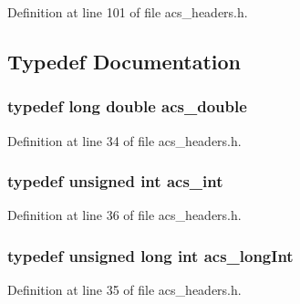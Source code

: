 Definition at line 101 of file acs\-\_\-headers.\-h.



\subsection{Typedef Documentation}
\hypertarget{a00072_ab776853a005fcbf56af0424a2a4dd607}{
\subsubsection[{acs\-\_\-double}]{\setlength{\rightskip}{0pt plus 5cm}typedef long double {\bf acs\-\_\-double}}}\label{a00072_ab776853a005fcbf56af0424a2a4dd607}


Definition at line 34 of file acs\-\_\-headers.\-h.

\hypertarget{a00072_a8d277355641a098190360234e2ebde35}{
\subsubsection[{acs\-\_\-int}]{\setlength{\rightskip}{0pt plus 5cm}typedef unsigned int {\bf acs\-\_\-int}}}\label{a00072_a8d277355641a098190360234e2ebde35}


Definition at line 36 of file acs\-\_\-headers.\-h.

\hypertarget{a00072_a19319d75f02db4308bc5c0026d98cd85}{
\subsubsection[{acs\-\_\-long\-Int}]{\setlength{\rightskip}{0pt plus 5cm}typedef unsigned long int {\bf acs\-\_\-long\-Int}}}\label{a00072_a19319d75f02db4308bc5c0026d98cd85}


Definition at line 35 of file acs\-\_\-headers.\-h.

